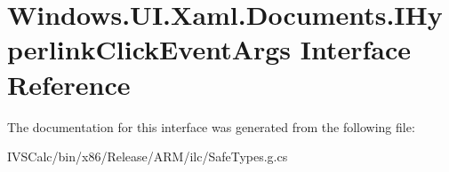 \hypertarget{interface_windows_1_1_u_i_1_1_xaml_1_1_documents_1_1_i_hyperlink_click_event_args}{}\section{Windows.\+U\+I.\+Xaml.\+Documents.\+I\+Hyperlink\+Click\+Event\+Args Interface Reference}
\label{interface_windows_1_1_u_i_1_1_xaml_1_1_documents_1_1_i_hyperlink_click_event_args}


The documentation for this interface was generated from the following file\+:\begin{DoxyCompactItemize}
\item 
I\+V\+S\+Calc/bin/x86/\+Release/\+A\+R\+M/ilc/Safe\+Types.\+g.\+cs\end{DoxyCompactItemize}

